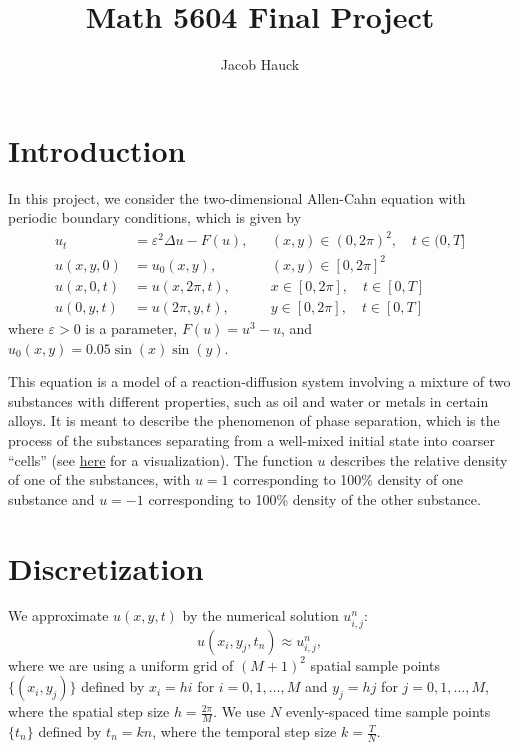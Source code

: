 \documentclass{article}
\title{Math 5604 Final Project}
\author{Jacob Hauck}
\begin{document}
	\maketitle
	
	\section{Introduction}
	
	In this project, we consider the two-dimensional Allen-Cahn equation \cite{yang_2018} with periodic boundary conditions, which is given by
	\begin{align}
		u_t &= \varepsilon^2 \Delta u - F(u),& & (x,y) \in (0,2\pi)^2,\quad t \in (0,T] \\
		u(x,y, 0) &= u_0(x,y),& & (x,y) \in [0,2\pi]^2 \\
		u(x, 0,t) &= u(x, 2\pi, t), & & x \in [0,2\pi],\quad t \in [0,T] \\
		u(0,y,t) &= u(2\pi,y,t), & & y \in [0,2\pi],\quad t \in [0,T]
	\end{align}
	where $\varepsilon > 0$ is a parameter, $F(u) = u^3 - u$, and $u_0(x,y) = 0.05\sin(x)\sin(y)$. 
	
	This equation is a model of a reaction-diffusion system involving a mixture of two substances with different properties, such as oil and water or metals in certain alloys. It is meant to describe the phenomenon of phase separation, which is the process of the substances separating from a well-mixed initial state into coarser ``cells'' (see \href{https://www.youtube.com/watch?v=t1swj0QJUTw}{here} for a visualization). The function $u$ describes the relative density of one of the substances, with $u = 1$ corresponding to 100\% density of one substance and $u=-1$ corresponding to 100\% density of the other substance.
	
	\section{Discretization}
	We approximate $u(x,y,t)$ by the numerical solution $u^n_{i,j}$:
	\begin{equation}
		u(x_i,y_j, t_n) \approx u^n_{i,j},
	\end{equation}
	where we are using a uniform grid of $(M+1)^2$ spatial sample points $\{(x_i,y_j)\}$ defined by $x_i = hi$ for $i = 0,1,\dots, M$ and $y_j = hj$ for $j =0,1,\dots,M$, where the spatial step size $h = \frac{2\pi}{M}$. We use $N$ evenly-spaced time sample points $\{t_n\}$ defined by $t_n = kn$, where the temporal step size $k = \frac{T}{N}$.
	
\end{document}
